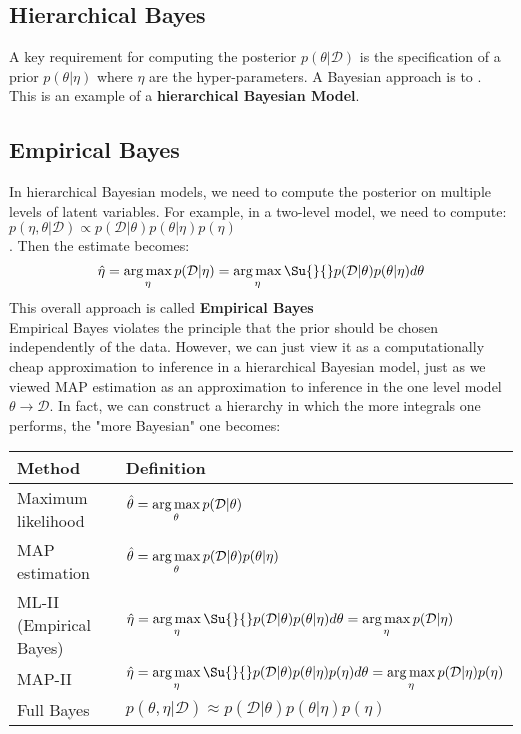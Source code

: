 \subsection{Hierarchical Bayes}
A key requirement for computing the posterior $p(\theta|\mathcal{D})$ is the 
specification of a prior $p(\theta|\eta)$ where $\eta$ are the hyper-parameters. A 
Bayesian approach is to . This is an example of a \textbf{
hierarchical Bayesian Model}.

\subsection{Empirical Bayes}
In hierarchical Bayesian models, we need to compute the posterior on multiple levels of
latent variables. For example, in a two-level model, we need to compute:
$p(\eta, \theta|\mathcal{D}) \propto p(\mathcal{D}|\theta)p(\theta|\eta)p(\eta)$\\
. Then the estimate becomes: 
$$ \hat{\eta} = \argmax_{\eta} p(\mathcal{D}|\eta) = \argmax_{\eta} \Su{}{}
p(\mathcal{D}|\theta)p(\theta|\mathcal{\eta})d\theta $$
This overall approach is called \textbf{Empirical Bayes}\\
Empirical Bayes violates the principle that the prior should be chosen independently of 
the data. However, we can just view it as a computationally cheap approximation to 
inference in a hierarchical Bayesian model, just as we viewed MAP estimation as an approximation to inference in the one level model $\theta \rightarrow \mathcal{D}$. In fact, we
can construct a hierarchy in which the more integrals one performs, the "more Bayesian" 
one becomes:
\begin{center}
	\begin{tabular}{|*{2}{l|}}
		\hline
		\textbf{Method} & \textbf{Definition} \\
		\hline
		Maximum likelihood & $\hat{\theta} = \displaystyle\operatorname*{arg\,max}_{\theta} 
		p(\mathcal{D}|\theta)$ \\
		\hline
		MAP estimation & $\hat{\theta} = \displaystyle\operatorname*{arg\,max}_{\theta} 
		p(\mathcal{D}|\theta)p(\theta|\eta)$ \\
		\hline
		ML-II (Empirical Bayes) & $\hat{\eta}=\displaystyle\argmax_{\eta}\Su{}{}
		p(\mathcal{D}|\theta)p(\theta|\eta)d\theta = \displaystyle\argmax_{\eta}p(\mathcal{D}|
		\eta)$ \\
		\hline
		MAP-II & $\hat{\eta}=\displaystyle\argmax_{\eta}\Su{}{}
		p(\mathcal{D}|\theta)p(\theta|\eta)p(\eta)d\theta = \displaystyle\argmax_{\eta}p(
		\mathcal{D}| \eta)p(\eta)$\\
		\hline
		Full Bayes & $p(\theta, \eta|\mathcal{D}) \approx p(\mathcal{D}|\theta)
		p(\theta|\eta)p(\eta)$\\
		\hline
	\end{tabular}
\end{center}

